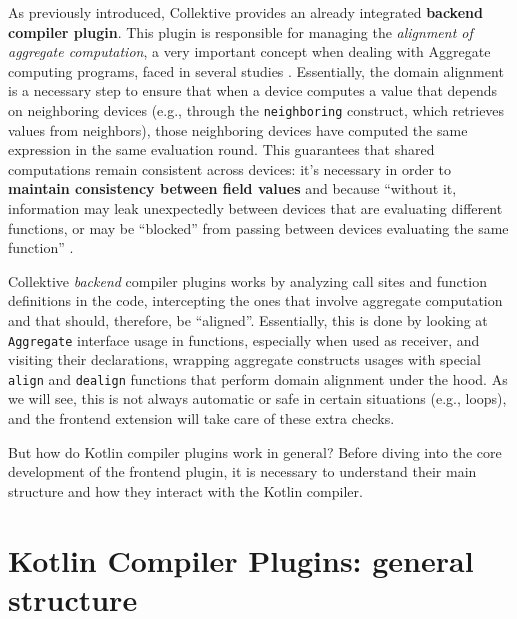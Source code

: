 \documentclass[12pt,a4paper,openright,twoside]{book}
\begin{document}
As previously introduced, Collektive provides an already integrated
\textbf{backend compiler plugin}. This plugin is responsible for managing the
\emph{alignment of aggregate computation}, a very important concept when dealing
with Aggregate computing programs, faced in several studies
\cite{DBLP:conf/forte/DamianiVPB15} \cite{DBLP:conf/saso/AudritoDVC16}.
%
Essentially, the domain alignment is a necessary step to ensure that when a
device computes a value that depends on neighboring devices (e.g., through the
\lstinline{neighboring} construct, which retrieves values from neighbors), those
neighboring devices have computed the same expression in the same evaluation
round. This guarantees that shared computations remain consistent across
devices: it's necessary in order to \textbf{maintain consistency between field
values} and  because ``without it, information
may leak unexpectedly between devices that are evaluating different functions,
or may be “blocked” from passing between devices evaluating the same function''
\cite{DBLP:conf/forte/DamianiVPB15}.

Collektive \emph{backend} compiler plugins works by analyzing call sites and
function definitions in the code, intercepting the ones that involve aggregate
computation and that should, therefore, be ``aligned''. Essentially, this is
done by looking at \lstinline{Aggregate} interface usage in functions,
especially when used as receiver, and visiting their declarations, wrapping
aggregate constructs usages with special \lstinline{align} and
\lstinline{dealign} functions that perform domain alignment under the hood.
%
As we will see, this is not always automatic or safe in certain situations 
(e.g., loops), and the frontend extension will take care of these extra 
checks. 

But how do Kotlin compiler plugins work in general? Before diving into the 
core development of the frontend plugin, it is necessary to understand their
main structure and how they interact with the Kotlin compiler.

\section{Kotlin Compiler Plugins: general structure} 
\end{document}
